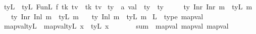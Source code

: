 \begin{isabellebody}
\isadelimdocument
%
\endisadelimdocument
%
\isatagdocument
%
\isamarkuptrue%
%
\endisatagdocument
{\isafolddocument}%
%
\isadelimdocument
%
\endisadelimdocument
{}\isamarkupfalse%
\ tyL\ \ {\isachardoublequoteopen}tyL\ {\isacharparenleft}{\kern0pt}FunL\ f\ tk\ tv{\isacharparenright}{\kern0pt}\ {\isacharequal}{\kern0pt}\ {\isacharparenleft}{\kern0pt}tk{\isacharcomma}{\kern0pt}\ tv{\isacharparenright}{\kern0pt}{\isachardoublequoteclose}\isanewline
\isanewline
{}\isamarkupfalse%
\ ty{}{}{}\ {\isacharcolon}{\kern0pt}{\isacharcolon}{\kern0pt}\ {\isachardoublequoteopen}{\isacharprime}{\kern0pt}a\ val{}{}{}\ {\isasymRightarrow}\ ty\ {\isasymtimes}\ ty{\isachardoublequoteclose}\ \isanewline
\ \ \ \ {\isachardoublequoteopen}ty{}{}{}\ {\isacharparenleft}{\kern0pt}Inr\ {\isacharparenleft}{\kern0pt}Inr\ m{\isacharparenright}{\kern0pt}{\isacharparenright}{\kern0pt}\ {\isacharequal}{\kern0pt}\ tyL\ m{\isachardoublequoteclose}\isanewline
\ \ {\isacharbar}{\kern0pt}\ {\isachardoublequoteopen}ty{}{}{}\ {\isacharparenleft}{\kern0pt}Inr\ {\isacharparenleft}{\kern0pt}Inl\ m{\isacharparenright}{\kern0pt}{\isacharparenright}{\kern0pt}\ {\isacharequal}{\kern0pt}\ tyL\ m{\isachardoublequoteclose}\isanewline
\ \ {\isacharbar}{\kern0pt}\ {\isachardoublequoteopen}ty{}{}{}\ {\isacharparenleft}{\kern0pt}Inl\ m{\isacharparenright}{\kern0pt}\ {\isacharequal}{\kern0pt}\ tyL\ m{\isachardoublequoteclose}\isanewline
\isanewline
{}\isamarkupfalse%
\ L\ {\isacharcolon}{\kern0pt}{\isacharcolon}{\kern0pt}\ {\isacharparenleft}{\kern0pt}type{\isacharparenright}{\kern0pt}\ mapval\ \isanewline
\ \ \isamarkupfalse%
\ mapval{\isacharunderscore}{\kern0pt}ty{\isacharunderscore}{\kern0pt}L\ \ {\isachardoublequoteopen}mapval{\isacharunderscore}{\kern0pt}ty{\isacharunderscore}{\kern0pt}L\ x\ {\isacharequal}{\kern0pt}\ tyL\ x{\isachardoublequoteclose}\isanewline
\ \ \isamarkupfalse%
%
\isadelimproof
\ %
\endisadelimproof
%
\isatagproof
\isakeywordONE{{\isachardot}{\kern0pt}{\isachardot}{\kern0pt}}\isamarkupfalse%
%
\endisatagproof
{\isafoldproof}%
%
\isadelimproof
%
\endisadelimproof
\ \isamarkupfalse%
\isanewline
\isanewline
{}\isamarkupfalse%
\ sum\ {\isacharcolon}{\kern0pt}{\isacharcolon}{\kern0pt}\ {\isacharparenleft}{\kern0pt}mapval{\isacharcomma}{\kern0pt}\ mapval{\isacharparenright}{\kern0pt}\ mapval\ \isanewline

\end{isabellebody}
